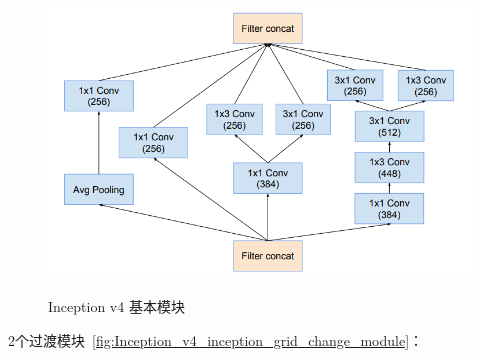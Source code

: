 \begin{figure}[htbp]
{\begin{minipage}{0.30\linewidth}
			\centering
			\includegraphics[width = \linewidth]{readings_figures/Inception_v4_8grid.png}
			\label{fig:Inception_v4_8grid}
		\end{minipage}
	}
	\centering
	\caption{Inception v4 基本模块}
	\label{fig:Inception_v4_inception_module}
\end{figure}

2个过渡模块~\ref{fig:Inception_v4_inception_grid_change_module}：

